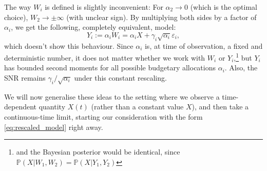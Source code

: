 \documentclass[10pt]{article}
\numberwithin{equation}{section}
\numberwithin{figure}{section}
\theoremstyle{remark}
\renewcommand{\P}{\mathbb P}
\newcommand{\eps}{\varepsilon}
\begin{document}
The way $W_i$ is defined is slightly inconvenient: For $\alpha_2\to 0$ (which is the optimal choice), $W_2 \to \pm\infty$ (with unclear sign). By multiplying both sides by a factor of $\alpha_i$, we get the following, completely equivalent, model:
\begin{equation}\label{eq:rescaled_model}
    Y_i := \alpha_i W_i = \alpha_i X+ \gamma_i \sqrt{\alpha_i}\eps_i,
\end{equation}
which doesn't show this behaviour. Since $\alpha_i$ is, at time of observation, a fixed and deterministic number, it does not matter whether we work with $W_i$ or $Y_i$,\footnote{and the Bayesian posterior would be identical, since $\P(X|W_1,W_2) = \P(X|Y_1,Y_2)$} but $Y_i$ has bounded second moments for all possible budgetary allocations $\alpha_i$. Also, the SNR remains $\gamma_i/\sqrt{\alpha_i}$ under this constant rescaling.

We will now generalise these ideas to the setting where we observe a time-dependent quantity $X(t)$ (rather than a constant value $X$), and then take a continuous-time limit, starting our consideration with the form \eqref{eq:rescaled_model} right away.
\end{document}

